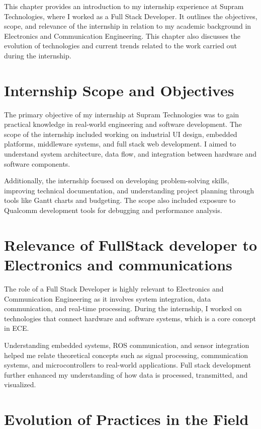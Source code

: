 \documentclass[12pt,a4paper]{report}
\begin{document}
This chapter provides an introduction to my internship experience at Supram Technologies, where I worked as a Full Stack Developer. It outlines the objectives, scope, and relevance of the internship in relation to my academic background in Electronics and Communication Engineering. This chapter also discusses the evolution of technologies and current trends related to the work carried out during the internship.


\section{Internship Scope and Objectives}

The primary objective of my internship at Supram Technologies was to gain practical knowledge in real-world engineering and software development. The scope of the internship included working on industrial UI design, embedded platforms, middleware systems, and full stack web development. I aimed to understand system architecture, data flow, and integration between hardware and software components.


Additionally, the internship focused on developing problem-solving skills, improving technical documentation, and understanding project planning through tools like Gantt charts and budgeting. The scope also included exposure to Qualcomm development tools for debugging and performance analysis.


\section{Relevance of FullStack developer to Electronics and communications}

The role of a Full Stack Developer is highly relevant to Electronics and Communication Engineering as it involves system integration, data communication, and real-time processing. During the internship, I worked on technologies that connect hardware and software systems, which is a core concept in ECE.


Understanding embedded systems, ROS communication, and sensor integration helped me relate theoretical concepts such as signal processing, communication systems, and microcontrollers to real-world applications. Full stack development further enhanced my understanding of how data is processed, transmitted, and visualized.


\section{Evolution of Practices in the Field}
\end{document}
